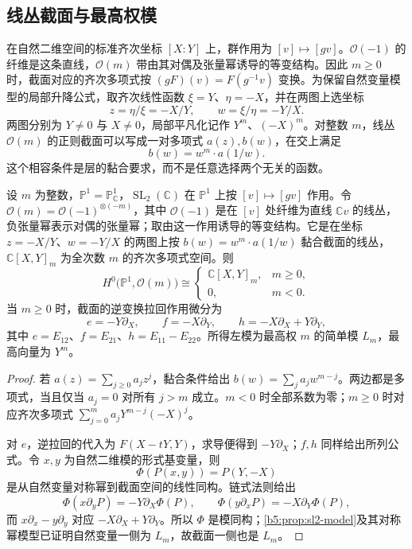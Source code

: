 \subsection{线丛截面与最高权模}
\label{b5:subsec:C04:02}

在自然二维空间的标准齐次坐标 \([X:Y]\) 上，群作用为 \([v]\mapsto[gv]\)。\(\mathcal O(-1)\) 的纤维是这条直线，\(\mathcal O(m)\) 带由其对偶及张量幂诱导的等变结构。因此 \(m\ge0\) 时，截面对应的齐次多项式按 \((gF)(v)=F(g^{-1}v)\) 变换。为保留自然变量模型的局部升降公式，取齐次线性函数 \(\xi=Y\)、\(\eta=-X\)，并在两图上选坐标
\[
	z=\eta/\xi=-X/Y,\qquad w=\xi/\eta=-Y/X.
\]
两图分别为 \(Y\ne0\) 与 \(X\ne0\)，局部平凡化记作 \(Y^m\)、\((-X)^m\)。对整数 \(m\)，线丛 \(\mathcal O(m)\) 的正则截面可以写成一对多项式 \(a(z),b(w)\)，在交上满足
\[
	b(w)=w^m\cdot a(1/w).
\]
这个相容条件是层的黏合要求，而不是任意选择两个无关的函数。

\begin{proposition}\label{b5:prop:projective-line-sections}
	设 \(m\) 为整数，\(\mathbb P^1=\mathbb P^1_{\mathbb C}\)，\(\operatorname{SL}_2(\mathbb C)\) 在 \(\mathbb P^1\) 上按 \([v]\mapsto[gv]\) 作用。令 \(\mathcal O(m)=\mathcal O(-1)^{\otimes(-m)}\)，其中 \(\mathcal O(-1)\) 是在 \([v]\) 处纤维为直线 \(\mathbb Cv\) 的线丛，负张量幂表示对偶的张量幂；取由这一作用诱导的等变结构。它是在坐标 \(z=-X/Y\)、\(w=-Y/X\) 的两图上按 \(b(w)=w^m\cdot a(1/w)\) 黏合截面的线丛，\(\mathbb C[X,Y]_m\) 为全次数 \(m\) 的齐次多项式空间。则
	\[
		H^0\bigl(\mathbb P^1,\mathcal O(m)\bigr) \cong
		\begin{cases}
			\mathbb C[X,Y]_m,&m\ge0,\\
			0,&m<0.
		\end{cases}
	\]
	当 \(m\ge0\) 时，截面的逆变换拉回作用微分为
	\[
		e=-Y\partial_X,\qquad f=-X\partial_Y,\qquad h=-X\partial_X+Y\partial_Y,
	\]
	其中 \(e=E_{12}\)、\(f=E_{21}\)、\(h=E_{11}-E_{22}\)。所得左模为最高权 \(m\) 的简单模 \(L_m\)，最高向量为 \(Y^m\)。
\end{proposition}
\begin{proof}
	若 \(a(z)=\sum_{j\ge0}a_jz^j\)，黏合条件给出 \(b(w)=\sum_j a_j w^{m-j}\)。两边都是多项式，当且仅当 \(a_j=0\) 对所有 \(j>m\) 成立。\(m<0\) 时全部系数为零；\(m\ge0\) 时对应齐次多项式 \(\sum_{j=0}^m a_jY^{m-j}(-X)^j\)。

	对 \(e\)，逆拉回的代入为 \(F(X-tY,Y)\)，求导便得到 \(-Y\partial_X\)；\(f,h\) 同样给出所列公式。令 \(x,y\) 为自然二维模的形式基变量，则
	\[
		\Phi(P(x,y))=P(Y,-X)
	\]
	是从自然变量对称幂到截面空间的线性同构。链式法则给出
	\[
		\Phi(x\partial_y P)=-Y\partial_X\Phi(P),\qquad \Phi(y\partial_x P)=-X\partial_Y\Phi(P),
	\]
	而 \(x\partial_x-y\partial_y\) 对应 \(-X\partial_X+Y\partial_Y\)。所以 \(\Phi\) 是模同构；\cref{b5:prop:sl2-model}及其对称幂模型已证明自然变量一侧为 \(L_m\)，故截面一侧也是 \(L_m\)。
\end{proof}

